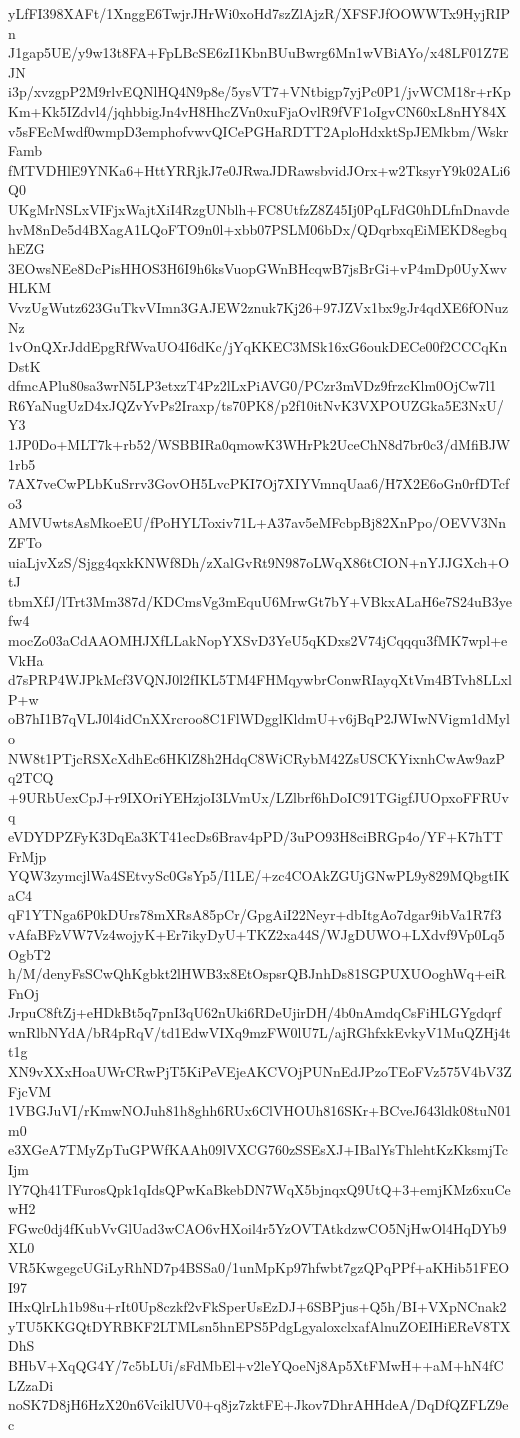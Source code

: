 yLfFI398XAFt/1XnggE6TwjrJHrWi0xoHd7szZlAjzR/XFSFJfOOWWTx9HyjRIPn
J1gap5UE/y9w13t8FA+FpLBcSE6zI1KbnBUuBwrg6Mn1wVBiAYo/x48LF01Z7EJN
i3p/xvzgpP2M9rlvEQNlHQ4N9p8e/5ysVT7+VNtbigp7yjPc0P1/jvWCM18r+rKp
Km+Kk5IZdvl4/jqhbbigJn4vH8HhcZVn0xuFjaOvlR9fVF1oIgvCN60xL8nHY84X
v5sFEcMwdf0wmpD3emphofvwvQICePGHaRDTT2AploHdxktSpJEMkbm/WskrFamb
fMTVDHlE9YNKa6+HttYRRjkJ7e0JRwaJDRawsbvidJOrx+w2TksyrY9k02ALi6Q0
UKgMrNSLxVIFjxWajtXiI4RzgUNblh+FC8UtfzZ8Z45Ij0PqLFdG0hDLfnDnavde
hvM8nDe5d4BXagA1LQoFTO9n0l+xbb07PSLM06bDx/QDqrbxqEiMEKD8egbqhEZG
3EOwsNEe8DcPisHHOS3H6I9h6ksVuopGWnBHcqwB7jsBrGi+vP4mDp0UyXwvHLKM
VvzUgWutz623GuTkvVImn3GAJEW2znuk7Kj26+97JZVx1bx9gJr4qdXE6fONuzNz
1vOnQXrJddEpgRfWvaUO4I6dKc/jYqKKEC3MSk16xG6oukDECe00f2CCCqKnDstK
dfmcAPlu80sa3wrN5LP3etxzT4Pz2lLxPiAVG0/PCzr3mVDz9frzcKlm0OjCw7l1
R6YaNugUzD4xJQZvYvPs2Iraxp/ts70PK8/p2f10itNvK3VXPOUZGka5E3NxU/Y3
1JP0Do+MLT7k+rb52/WSBBIRa0qmowK3WHrPk2UceChN8d7br0c3/dMfiBJW1rb5
7AX7veCwPLbKuSrrv3GovOH5LvcPKI7Oj7XIYVmnqUaa6/H7X2E6oGn0rfDTcfo3
AMVUwtsAsMkoeEU/fPoHYLToxiv71L+A37av5eMFcbpBj82XnPpo/OEVV3NnZFTo
uiaLjvXzS/Sjgg4qxkKNWf8Dh/zXalGvRt9N987oLWqX86tCION+nYJJGXch+OtJ
tbmXfJ/lTrt3Mm387d/KDCmsVg3mEquU6MrwGt7bY+VBkxALaH6e7S24uB3yefw4
mocZo03aCdAAOMHJXfLLakNopYXSvD3YeU5qKDxs2V74jCqqqu3fMK7wpl+eVkHa
d7sPRP4WJPkMcf3VQNJ0l2fIKL5TM4FHMqywbrConwRIayqXtVm4BTvh8LLxlP+w
oB7hI1B7qVLJ0l4idCnXXrcroo8C1FlWDgglKldmU+v6jBqP2JWIwNVigm1dMylo
NW8t1PTjcRSXcXdhEc6HKlZ8h2HdqC8WiCRybM42ZsUSCKYixnhCwAw9azPq2TCQ
+9URbUexCpJ+r9IXOriYEHzjoI3LVmUx/LZlbrf6hDoIC91TGigfJUOpxoFFRUvq
eVDYDPZFyK3DqEa3KT41ecDs6Brav4pPD/3uPO93H8ciBRGp4o/YF+K7hTTFrMjp
YQW3zymcjlWa4SEtvySc0GsYp5/I1LE/+zc4COAkZGUjGNwPL9y829MQbgtIKaC4
qF1YTNga6P0kDUrs78mXRsA85pCr/GpgAiI22Neyr+dbItgAo7dgar9ibVa1R7f3
vAfaBFzVW7Vz4wojyK+Er7ikyDyU+TKZ2xa44S/WJgDUWO+LXdvf9Vp0Lq5OgbT2
h/M/denyFsSCwQhKgbkt2lHWB3x8EtOspsrQBJnhDs81SGPUXUOoghWq+eiRFnOj
JrpuC8ftZj+eHDkBt5q7pnI3qU62nUki6RDeUjirDH/4b0nAmdqCsFiHLGYgdqrf
wnRlbNYdA/bR4pRqV/td1EdwVIXq9mzFW0lU7L/ajRGhfxkEvkyV1MuQZHj4tt1g
XN9vXXxHoaUWrCRwPjT5KiPeVEjeAKCVOjPUNnEdJPzoTEoFVz575V4bV3ZFjcVM
1VBGJuVI/rKmwNOJuh81h8ghh6RUx6ClVHOUh816SKr+BCveJ643ldk08tuN01m0
e3XGeA7TMyZpTuGPWfKAAh09lVXCG760zSSEsXJ+IBalYsThlehtKzKksmjTcIjm
lY7Qh41TFurosQpk1qIdsQPwKaBkebDN7WqX5bjnqxQ9UtQ+3+emjKMz6xuCewH2
FGwc0dj4fKubVvGlUad3wCAO6vHXoil4r5YzOVTAtkdzwCO5NjHwOl4HqDYb9XL0
VR5KwgegcUGiLyRhND7p4BSSa0/1unMpKp97hfwbt7gzQPqPPf+aKHib51FEOI97
IHxQlrLh1b98u+rIt0Up8czkf2vFkSperUsEzDJ+6SBPjus+Q5h/BI+VXpNCnak2
yTU5KKGQtDYRBKF2LTMLsn5hnEPS5PdgLgyaloxclxafAlnuZOEIHiEReV8TXDhS
BHbV+XqQG4Y/7c5bLUi/sFdMbEl+v2leYQoeNj8Ap5XtFMwH++aM+hN4fCLZzaDi
noSK7D8jH6HzX20n6VciklUV0+q8jz7zktFE+Jkov7DhrAHHdeA/DqDfQZFLZ9ec
